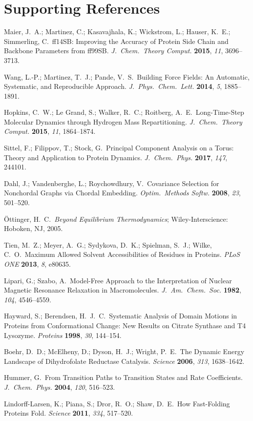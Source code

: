 \documentclass[10pt,letterpaper]{article}
\begin{document}
\section*{Supporting References}
\begin{enumerate}[leftmargin=16pt, itemsep=1.5pt, topsep=2pt, label={[\arabic*]}]
\item Maier, J.\ A.; Martinez, C.; Kasavajhala, K.; Wickstrom, L.; Hauser, K.\ E.; Simmerling, C.\ ff14SB: Improving the Accuracy of Protein Side Chain and Backbone Parameters from ff99SB. \textit{J.\ Chem.\ Theory Comput.} \textbf{2015}, \textit{11}, 3696--3713.
\item Wang, L.-P.; Martinez, T.\ J.; Pande, V.\ S.\ Building Force Fields: An Automatic, Systematic, and Reproducible Approach. \textit{J.\ Phys.\ Chem.\ Lett.} \textbf{2014}, \textit{5}, 1885--1891.
\item Hopkins, C.\ W.; Le Grand, S.; Walker, R.\ C.; Roitberg, A.\ E.\ Long-Time-Step Molecular Dynamics through Hydrogen Mass Repartitioning. \textit{J.\ Chem.\ Theory Comput.} \textbf{2015}, \textit{11}, 1864--1874.
\item Sittel, F.; Filippov, T.; Stock, G.\ Principal Component Analysis on a Torus: Theory and Application to Protein Dynamics. \textit{J.\ Chem.\ Phys.} \textbf{2017}, \textit{147}, 244101.
\item Dahl, J.; Vandenberghe, L.; Roychowdhury, V.\ Covariance Selection for Nonchordal Graphs via Chordal Embedding. \textit{Optim.\ Methods Softw.} \textbf{2008}, \textit{23}, 501--520.
\item \"Ottinger, H.\ C.\ \textit{Beyond Equilibrium Thermodynamics}; Wiley-Interscience: Hoboken, NJ, 2005.
\item Tien, M.\ Z.; Meyer, A.\ G.; Sydykova, D.\ K.; Spielman, S.\ J.; Wilke, C.\ O.\ Maximum Allowed Solvent Accessibilities of Residues in Proteins. \textit{PLoS ONE} \textbf{2013}, \textit{8}, e80635.
\item Lipari, G.; Szabo, A.\ Model-Free Approach to the Interpretation of Nuclear Magnetic Resonance Relaxation in Macromolecules. \textit{J.\ Am.\ Chem.\ Soc.} \textbf{1982}, \textit{104}, 4546--4559.
\item Hayward, S.; Berendsen, H.\ J.\ C.\ Systematic Analysis of Domain Motions in Proteins from Conformational Change: New Results on Citrate Synthase and T4 Lysozyme. \textit{Proteins} \textbf{1998}, \textit{30}, 144--154.
\item Boehr, D.\ D.; McElheny, D.; Dyson, H.\ J.; Wright, P.\ E.\ The Dynamic Energy Landscape of Dihydrofolate Reductase Catalysis. \textit{Science} \textbf{2006}, \textit{313}, 1638--1642.
\item Hummer, G.\ From Transition Paths to Transition States and Rate Coefficients. \textit{J.\ Chem.\ Phys.} \textbf{2004}, \textit{120}, 516--523.
\item Lindorff-Larsen, K.; Piana, S.; Dror, R.\ O.; Shaw, D.\ E.\ How Fast-Folding Proteins Fold. \textit{Science} \textbf{2011}, \textit{334}, 517--520.
\end{enumerate}
\end{document}
